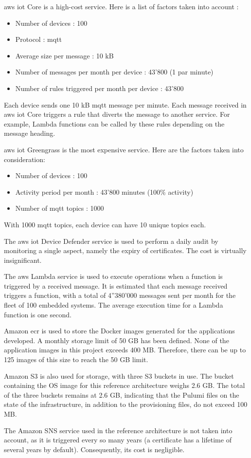 \gls{aws} \acrshort{iot} Core is a high-cost service. Here is a list of factors taken into account :
\begin{itemize}
    \item Number of devices : 100
    \item Protocol : \acrshort{mqtt}
    \item Average size per message : 10 kB
    \item Number of messages per month per device : 43'800 (1 par minute)
    \item Number of rules triggered per month per device : 43'800
\end{itemize}
Each device sends one 10 kB \acrshort{mqtt} message per minute. Each message received in \gls{aws} \acrshort{iot} Core triggers a rule that diverts the message to another service. For example, Lambda functions can be called by these rules depending on the message heading.

\gls{aws} \acrshort{iot} Greengrass is the most expensive service. Here are the factors taken into consideration:
\begin{itemize}
    \item Number of devices : 100
    \item Activity period per month : 43'800 minutes (100\% activity)
    \item Number of \acrshort{mqtt} topics : 1000
\end{itemize}
With 1000 \acrshort{mqtt} topics, each device can have 10 unique topics each.

The \gls{aws} \acrshort{iot} Device Defender service is used to perform a daily audit by monitoring a single aspect, namely the expiry of certificates. The cost is virtually insignificant.

The \gls{aws} Lambda service is used to execute operations when a function is triggered by a received message. It is estimated that each message received triggers a function, with a total of 4''380'000 messages sent per month for the fleet of 100 embedded systems. The average execution time for a Lambda function is one second.

Amazon \acrfull{ecr} is used to store the Docker images generated for the applications developed. A monthly storage limit of 50 GB has been defined. None of the application images in this project exceeds 400 MB. Therefore, there can be up to 125 images of this size to reach the 50 GB limit.

Amazon S3 is also used for storage, with three S3 buckets in use. The bucket containing the OS image for this reference architecture weighs 2.6 GB. The total of the three buckets remains at 2.6 GB, indicating that the Pulumi files on the state of the infrastructure, in addition to the provisioning files, do not exceed 100 MB.

The Amazon SNS service used in the reference architecture is not taken into account, as it is triggered every so many years (a certificate has a lifetime of several years by default). Consequently, its cost is negligible.